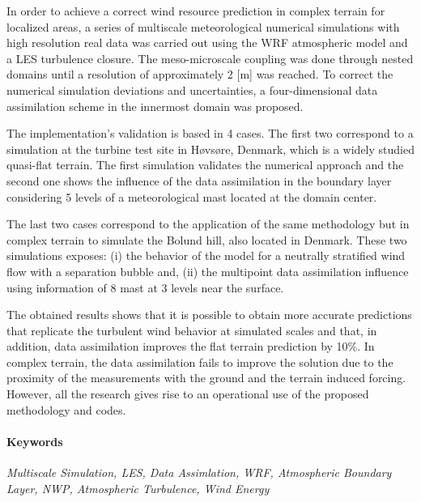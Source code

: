 In order to achieve a correct wind resource prediction in complex terrain for localized areas, a series of multiscale meteorological numerical simulations with high resolution real data was carried out using the WRF atmospheric model and a LES turbulence closure.
The meso-microscale coupling was done through nested domains until a resolution of approximately 2 [m] was reached. To correct the numerical simulation deviations and uncertainties, a four-dimensional data assimilation scheme in the innermost domain was proposed. 

The implementation's validation is based in 4 cases. The first two correspond to a simulation at the turbine test site in Høvsøre, Denmark, which is a widely studied quasi-flat terrain. The first simulation validates the numerical approach and the second one shows the influence of the data assimilation in the boundary layer considering 5 levels of a meteorological mast located at the domain center.

The last two cases correspond to the application of the same methodology but in complex terrain to simulate the Bolund hill, also located in Denmark. These two simulations exposes: (i) the behavior of the model for a neutrally stratified wind flow with a separation bubble and, (ii) the multipoint data assimilation influence using information of 8 mast at 3 levels near the surface.

The obtained results shows that it is possible to obtain more accurate predictions that replicate the turbulent wind behavior at simulated scales and that, in addition, data assimilation improves the flat terrain prediction by 10\%.  In complex terrain, the data assimilation fails to improve the solution due to the proximity of the measurements with the ground and the terrain induced forcing. However, all the research gives rise to an operational use of the proposed methodology and codes.

\color{black}
\paragraph{Keywords} \emph{Multiscale Simulation, LES, Data Assimlation, WRF, Atmospheric Boundary Layer, NWP, Atmospheric Turbulence, Wind Energy}
